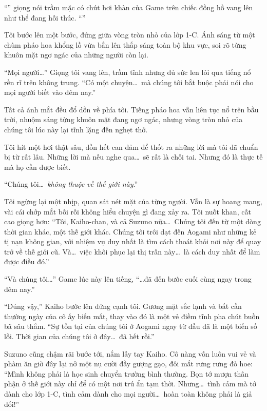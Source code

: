 \documentclass[../main.tex]{subfiles}
\begin{document}
``'' giọng nói trầm mặc có chút hơi khàn của Game trên chiếc đồng hồ vang lên như thể đang hối thúc. ``''

Tôi bước lên một bước, đứng giữa vòng tròn nhỏ của lớp 1-C. Ánh sáng từ một chùm pháo hoa khổng lồ vừa bắn lên thắp sáng toàn bộ khu vực, soi rõ từng khuôn mặt ngơ ngác của những người còn lại.

``Mọi người\dots'' Giọng tôi vang lên, trầm tĩnh nhưng đủ sức len lỏi qua tiếng nổ rền rĩ trên không trung. ``Có một chuyện\dots\ mà chúng tôi bắt buộc phải nói cho mọi người biết vào đêm nay.''

Tất cả ánh mắt đều đổ dồn về phía tôi. Tiếng pháo hoa vẫn liên tục nổ trên bầu trời, nhuộm sáng từng khuôn mặt đang ngơ ngác, nhưng vòng tròn nhỏ của chúng tôi lúc này lại tĩnh lặng đến nghẹt thở.

Tôi hít một hơi thật sâu, dồn hết can đảm để thốt ra những lời mà tôi đã chuẩn bị từ rất lâu. Những lời mà nếu nghe qua\dots\ sẽ rất là chối tai. Nhưng đó là thực tế mà họ cần được biết.

``Chúng tôi\dots\ \emph{không thuộc về thế giới này}.''

Tôi ngừng lại một nhịp, quan sát nét mặt của từng người. Vẫn là sự hoang mang, vài cái chớp mắt bối rối không hiểu chuyện gì đang xảy ra. Tôi nuốt khan, cất cao giọng hơn: ``Tôi, Kaiho-chan, và cả Suzuno nữa\dots\ Chúng tôi đến từ một dòng thời gian khác, một thế giới khác. Chúng tôi trôi dạt đến Aogami như những kẻ tị nạn không gian, với nhiệm vụ duy nhất là tìm cách thoát khỏi nơi này để quay trở về thế giới cũ. Và\dots\ việc khôi phục lại thị trấn này\dots\ là cách duy nhất để làm được điều đó.''

``Và chúng tôi\dots'' Game lúc này lên tiếng, ``\dots đã đến bước cuối cùng ngay trong đêm nay.''

``Đúng vậy,'' Kaiho bước lên đứng cạnh tôi. Gương mặt sắc lạnh và bất cần thường ngày của cô ấy biến mất, thay vào đó là một vẻ điềm tĩnh pha chút buồn bã sâu thẳm. ``Sự tồn tại của chúng tôi ở Aogami ngay từ đầu đã là một biến số lỗi. Thời gian của chúng tôi ở đây\dots\ đã hết rồi.''

Suzuno cũng chậm rãi bước tới, nắm lấy tay Kaiho. Cô nàng vốn luôn vui vẻ và phàm ăn giờ đây lại nở một nụ cười đầy gượng gạo, đôi mắt rưng rưng đỏ hoe: ``Mình không phải là học sinh chuyển trường bình thường. Bọn tớ mượn thân phận ở thế giới này chỉ để có một nơi trú ẩn tạm thời. Nhưng\dots\ tình cảm mà tớ dành cho lớp 1-C, tình cảm dành cho mọi người\dots\ hoàn toàn không phải là giả dối!''
\end{document}
